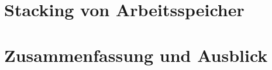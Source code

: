 \documentclass[ngerman, a4paper, 12pt, twoside]{article}
\numberwithin{equation}{section} %
\begin{document}
\section{Stacking von Arbeitsspeicher}
	
\clearpage

\section{Zusammenfassung und Ausblick}
	
\clearpage

\newpage
{}
\renewcommand\refname{Quellen} %
{ %
}

\newpage
{}
{}
\listoffigures

\newpage
{}
{}
\listoftables
\end{document}
